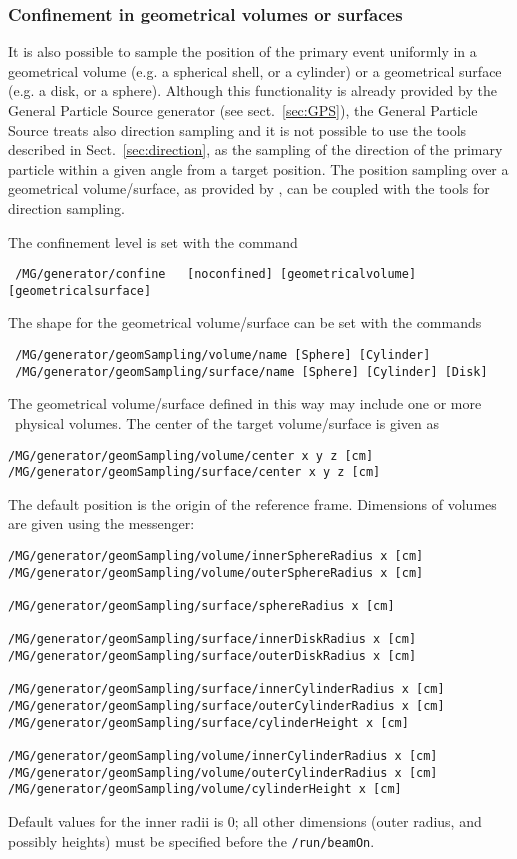 \subsubsection{Confinement in geometrical volumes or surfaces}
It is also possible to sample the position of the primary event uniformly in a geometrical 
volume (e.g. a spherical shell, or a cylinder) or a geometrical surface (e.g. a disk, or a sphere). 
Although this functionality is already provided by the General Particle Source generator 
(see sect.~\ref{sec:GPS}), the General Particle Source treats also direction sampling and it is 
not possible to use the tools described in Sect.~\ref{sec:direction}, as the sampling of the 
direction of the primary particle within a given angle from a target position. The position sampling 
over a geometrical volume/surface, as provided by \mage, can be coupled with the tools for 
direction sampling.

The confinement level is set with the command 
\begin{lstlisting}
 /MG/generator/confine   [noconfined] [geometricalvolume] [geometricalsurface] 
\end{lstlisting}

The shape for the geometrical volume/surface can be set with the commands
\begin{lstlisting}
 /MG/generator/geomSampling/volume/name [Sphere] [Cylinder] 
 /MG/generator/geomSampling/surface/name [Sphere] [Cylinder] [Disk] 
\end{lstlisting}
The geometrical volume/surface defined in this way may include one or more \mage\ physical 
volumes. The center of the target volume/surface is given as
\begin{lstlisting}
/MG/generator/geomSampling/volume/center x y z [cm] 
/MG/generator/geomSampling/surface/center x y z [cm]
\end{lstlisting}
The default position is the origin of the reference frame. Dimensions of volumes are given using 
the messenger:
\begin{lstlisting}
/MG/generator/geomSampling/volume/innerSphereRadius x [cm]
/MG/generator/geomSampling/volume/outerSphereRadius x [cm]

/MG/generator/geomSampling/surface/sphereRadius x [cm]

/MG/generator/geomSampling/surface/innerDiskRadius x [cm]
/MG/generator/geomSampling/surface/outerDiskRadius x [cm]

/MG/generator/geomSampling/surface/innerCylinderRadius x [cm]
/MG/generator/geomSampling/surface/outerCylinderRadius x [cm]
/MG/generator/geomSampling/surface/cylinderHeight x [cm]

/MG/generator/geomSampling/volume/innerCylinderRadius x [cm]
/MG/generator/geomSampling/volume/outerCylinderRadius x [cm]
/MG/generator/geomSampling/volume/cylinderHeight x [cm]
\end{lstlisting}
Default values for the inner radii is 0; all other dimensions (outer radius, and possibly 
heights) must be specified before the \texttt{/run/beamOn}.

